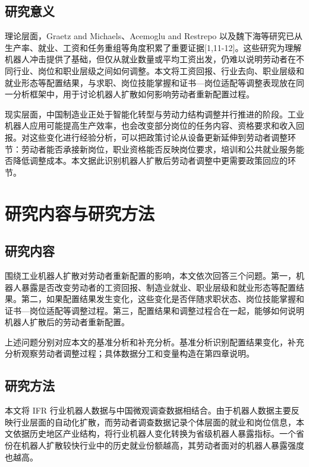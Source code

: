 \documentclass[UTF8, zihao=-4, a4paper, openany, fontset=none]{ctexrep}
\numberwithin{equation}{chapter}
\begin{document}
\subsection{研究意义}\label{ux7814ux7a76ux610fux4e49}

理论层面，Graetz and Michaels、Acemoglu and Restrepo 以及魏下海等研究已从生产率、就业、工资和任务重组等角度积累了重要证据{[}1,11-12{]}。这些研究为理解机器人冲击提供了基础，但仅从就业数量或平均工资出发，仍难以说明劳动者在不同行业、岗位和职业层级之间如何调整。本文将工资回报、行业去向、职业层级和就业形态等配置结果，与求职、岗位技能掌握和证书---岗位适配等调整表现放在同一分析框架中，用于讨论机器人扩散如何影响劳动者重新配置过程。

现实层面，中国制造业正处于智能化转型与劳动力结构调整并行推进的阶段。工业机器人应用可能提高生产效率，也会改变部分岗位的任务内容、资格要求和收入回报。对这些变化进行经验分析，可以把政策讨论从设备更新延伸到劳动者调整环节：劳动者能否承接新岗位，职业资格能否反映岗位要求，培训和公共就业服务能否降低调整成本。本文据此识别机器人扩散后劳动者调整中更需要政策回应的环节。

\section{研究内容与研究方法}\label{ux7814ux7a76ux5185ux5bb9ux4e0eux7814ux7a76ux65b9ux6cd5}

\subsection{研究内容}\label{ux7814ux7a76ux5185ux5bb9}

围绕工业机器人扩散对劳动者重新配置的影响，本文依次回答三个问题。第一，机器人暴露是否改变劳动者的工资回报、制造业就业、职业层级和就业形态等配置结果。第二，如果配置结果发生变化，这些变化是否伴随求职状态、岗位技能掌握和证书---岗位适配等调整过程。第三，配置结果和调整过程合在一起，能够如何说明机器人扩散后的劳动者重新配置。

上述问题分别对应本文的基准分析和补充分析。基准分析识别配置结果变化，补充分析观察劳动者调整过程；具体数据分工和变量构造在第四章说明。

\subsection{研究方法}\label{ux7814ux7a76ux65b9ux6cd5}

本文将 IFR 行业机器人数据与中国微观调查数据相结合。由于机器人数据主要反映行业层面的自动化扩散，而劳动者调查数据记录个体层面的就业和岗位信息，本文依据历史地区产业结构，将行业机器人变化转换为省级机器人暴露指标。一个省份在机器人扩散较快行业中的历史就业份额越高，其劳动者面对的机器人暴露强度也越高。
\end{document}
